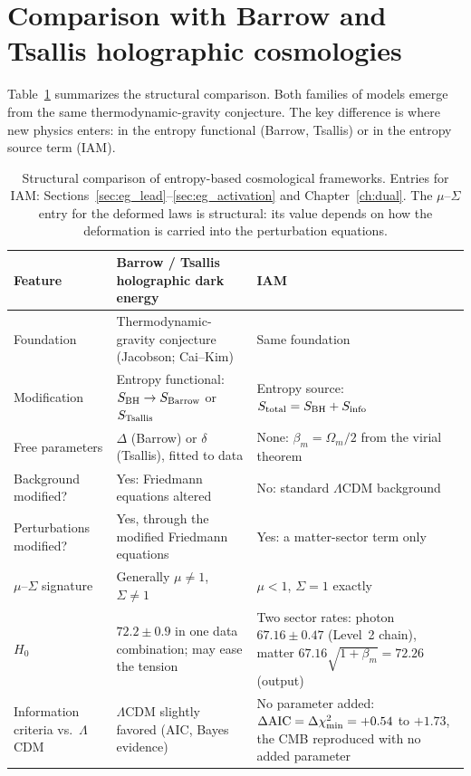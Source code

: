 \section{Comparison with Barrow and Tsallis holographic cosmologies}\label{sec:eg_compare}
Table~\ref{tab:eg_compare} summarizes the structural comparison. Both families of models emerge from the same thermodynamic-gravity conjecture. The key
difference is where new physics enters: in the entropy functional (Barrow, Tsallis) or in the entropy source term (IAM).

\begin{table}[htbp]
\centering\small
\caption{Structural comparison of entropy-based cosmological frameworks. Entries for IAM: Sections~\ref{sec:eg_lead}--\ref{sec:eg_activation} and
Chapter~\ref{ch:dual}. The $\mu$--$\Sigma$ entry for the deformed laws is structural: its value depends on how the deformation is carried into the
perturbation equations. \interp}\label{tab:eg_compare}
\renewcommand{\arraystretch}{1.3}
\begin{tabularx}{\linewidth}{@{}>{\raggedright\arraybackslash}p{2.7cm}>{\raggedright\arraybackslash}X>{\raggedright\arraybackslash}X@{}}
\toprule
Feature & Barrow / Tsallis holographic dark energy & IAM \\
\midrule
Foundation & Thermodynamic-gravity conjecture (Jacobson; Cai--Kim) & Same foundation \\
Modification & Entropy functional: $S_{\rm BH}\to S_{\rm Barrow}$ or $S_{\rm Tsallis}$ & Entropy source: $S_{\rm total}=S_{\rm BH}+S_{\rm info}$ \\
Free parameters & $\Delta$ (Barrow) or $\delta$ (Tsallis), fitted to data & None: $\beta_m=\Omega_m/2$ from the virial theorem \\
Background modified? & Yes: Friedmann equations altered & No: standard $\Lambda$CDM background \\
Perturbations modified? & Yes, through the modified Friedmann equations & Yes: a matter-sector term only \\
$\mu$--$\Sigma$ signature & Generally $\mu\neq1$, $\Sigma\neq1$ & $\mu<1$, $\Sigma=1$ exactly \\
$H_0$ & $72.2\pm0.9$ in one data combination; may ease the tension~\cite{Luciano2025} & Two sector rates: photon $67.16\pm0.47$ (Level~2 chain), matter
$67.16\sqrt{1+\beta_m}=72.26$ (output) \\
Information criteria vs.\ $\Lambda$CDM & $\Lambda$CDM slightly favored (AIC, Bayes evidence)~\cite{Luciano2025} & No parameter added: $\Delta{\rm AIC}=\Delta\chi^2_{\min}=+0.54$ to
$+1.73$, the CMB reproduced with no added parameter \\
\bottomrule
\end{tabularx}
\end{table}

